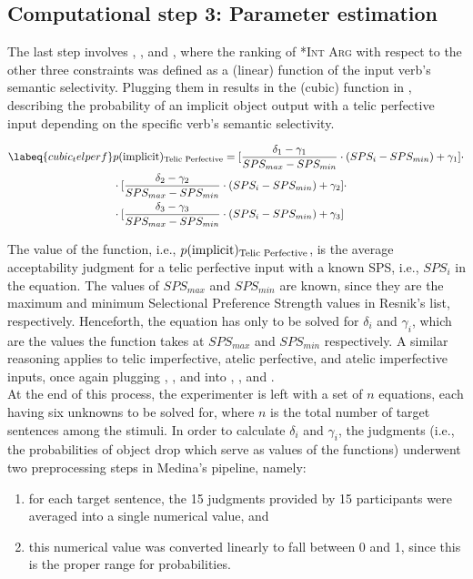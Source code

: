 \subsection{Computational step 3: Parameter estimation} The last step involves , , and , where the ranking of \textsc{*Int Arg} with respect to the other three constraints was defined as a (linear) function of the input verb's semantic selectivity. Plugging them in  results in the (cubic) function in , describing the probability of an implicit object output with a telic perfective input depending on the specific verb's semantic selectivity.

\begin{align}  \labeq{cubic_telperf}
    & p(\text{implicit})\textsubscript{Telic Perfective} = [\frac{\delta_1 - \gamma_1}{SPS_{max} - SPS_{min}} \cdot ({SPS_{i} - SPS_{min}}) + \gamma_1] \cdot \nonumber \\ & \cdot [\frac{\delta_2 - \gamma_2}{SPS_{max} - SPS_{min}} \cdot ({SPS_{i} - SPS_{min}}) + \gamma_2] \cdot \nonumber \\ & \cdot [\frac{\delta_3 - \gamma_3}{SPS_{max} - SPS_{min}} \cdot ({SPS_{i} - SPS_{min}}) + \gamma_3]
\end{align}

The value of the function, i.e., $p(\text{implicit})\textsubscript{Telic Perfective}$, is the average acceptability judgment for a telic perfective input with a known SPS, i.e., $SPS_{i}$ in the equation. The values of $SPS_{max}$ and $SPS_{min}$ are known, since they are the maximum and minimum Selectional Preference Strength values in Resnik's list, respectively. Henceforth, the equation has only to be solved for $\delta_i$ and $\gamma_i$, which are the values the function takes at $SPS_{max}$ and $SPS_{min}$ respectively. A similar reasoning applies to telic imperfective, atelic perfective, and atelic imperfective inputs, once again plugging , , and  into , , and .\\
At the end of this process, the experimenter is left with a set of $n$ equations, each having six unknowns to be solved for, where $n$ is the total number of target sentences among the stimuli. In order to calculate $\delta_i$ and $\gamma_i$, the judgments (i.e., the probabilities of object drop which serve as values of the functions) underwent two preprocessing steps in Medina's pipeline, namely:
\begin{enumerate}
    \item for each target sentence, the 15 judgments provided by 15 participants were averaged into a single numerical value, and
    \item this numerical value was converted linearly to fall between 0 and 1, since this is the proper range for probabilities.
\end{enumerate}

